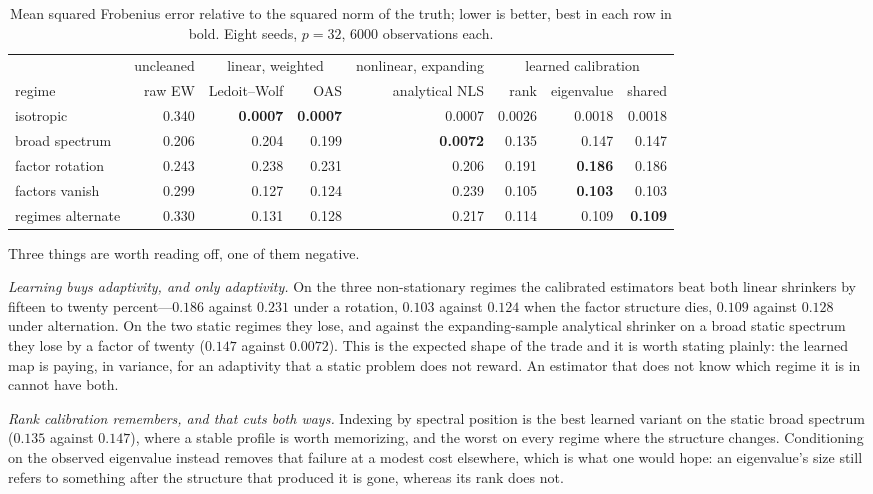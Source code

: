 \documentclass[11pt]{article}
\begin{document}
\begin{table}[ht]
\centering
\small
\begin{tabular}{lrrrrrrr}
\toprule
 & uncleaned & \multicolumn{2}{c}{linear, weighted} & nonlinear, expanding & \multicolumn{3}{c}{learned calibration} \\
\cmidrule(lr){2-2}\cmidrule(lr){3-4}\cmidrule(lr){5-5}\cmidrule(lr){6-8}
regime & raw EW & Ledoit--Wolf & OAS & analytical NLS & rank & eigenvalue & shared \\
\midrule
isotropic         & 0.340 & \textbf{0.0007} & \textbf{0.0007} & 0.0007          & 0.0026 & 0.0018          & 0.0018 \\
broad spectrum    & 0.206 & 0.204           & 0.199           & \textbf{0.0072} & 0.135  & 0.147           & 0.147  \\
factor rotation   & 0.243 & 0.238           & 0.231           & 0.206           & 0.191  & \textbf{0.186}  & 0.186  \\
factors vanish    & 0.299 & 0.127           & 0.124           & 0.239           & 0.105  & \textbf{0.103}  & 0.103  \\
regimes alternate & 0.330 & 0.131           & 0.128           & 0.217           & 0.114  & 0.109           & \textbf{0.109} \\
\bottomrule
\end{tabular}
\caption{Mean squared Frobenius error relative to the squared norm of the truth; lower is better,
best in each row in bold. Eight seeds, $p=32$, $6000$ observations each.}
\end{table}

Three things are worth reading off, one of them negative.

\emph{Learning buys adaptivity, and only adaptivity.} On the three non-stationary regimes the
calibrated estimators beat both linear shrinkers by fifteen to twenty percent---$0.186$ against
$0.231$ under a rotation, $0.103$ against $0.124$ when the factor structure dies, $0.109$ against
$0.128$ under alternation. On the two static regimes they lose, and against the expanding-sample
analytical shrinker on a broad static spectrum they lose by a factor of twenty ($0.147$ against
$0.0072$). This is the expected shape of the trade and it is worth stating plainly: the learned map
is paying, in variance, for an adaptivity that a static problem does not reward. An estimator that
does not know which regime it is in cannot have both.

\emph{Rank calibration remembers, and that cuts both ways.} Indexing by spectral position is the
best learned variant on the static broad spectrum ($0.135$ against $0.147$), where a stable profile
is worth memorizing, and the worst on every regime where the structure changes. Conditioning on the
observed eigenvalue instead removes that failure at a modest cost elsewhere, which is what one would
hope: an eigenvalue's size still refers to something after the structure that produced it is gone,
whereas its rank does not.
\end{document}
